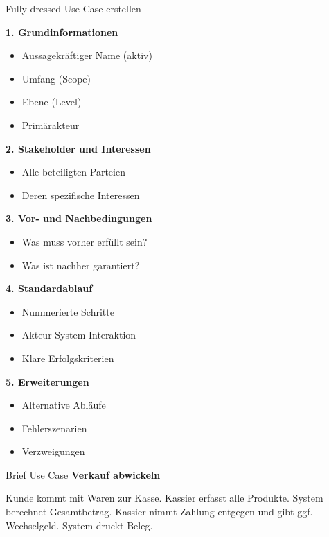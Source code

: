 \begin{KR}{Fully-dressed Use Case erstellen}

\begin{minipage}[t]{0.55\linewidth}
\textbf{1. Grundinformationen}
\begin{itemize}
    \item Aussagekräftiger Name (aktiv)
    \item Umfang (Scope)
    \item Ebene (Level)
    \item Primärakteur
\end{itemize}

\textbf{2. Stakeholder und Interessen}
\begin{itemize}
    \item Alle beteiligten Parteien
    \item Deren spezifische Interessen
\end{itemize}

\textbf{3. Vor- und Nachbedingungen}
\begin{itemize}
    \item Was muss vorher erfüllt sein?
    \item Was ist nachher garantiert?
\end{itemize}
\end{minipage}
\begin{minipage}[t]{0.45\linewidth}
\textbf{4. Standardablauf}
\begin{itemize}
    \item Nummerierte Schritte
    \item Akteur-System-Interaktion
    \item Klare Erfolgskriterien
\end{itemize}

\textbf{5. Erweiterungen}
\begin{itemize}
    \item Alternative Abläufe
    \item Fehlerszenarien
    \item Verzweigungen
\end{itemize}
\end{minipage}
\end{KR}

\begin{example2}{Brief Use Case}
\textbf{Verkauf abwickeln}

Kunde kommt mit Waren zur Kasse. Kassier erfasst alle Produkte. System berechnet Gesamtbetrag. Kassier nimmt Zahlung entgegen und gibt ggf. Wechselgeld. System druckt Beleg.
\end{example2}

